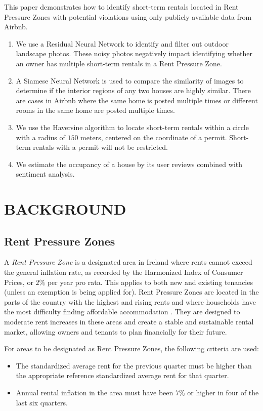 \documentclass[conference, compsoc]{IEEEtran}
\begin{document}
This paper demonstrates how to identify short-term rentals located in Rent Pressure Zones with potential violations using only publicly available data from Airbnb.
\begin{enumerate}
    \item
    We use a Residual Neural Network to identify and filter out outdoor landscape photos.
    These noisy photos negatively impact identifying whether an owner has multiple short-term rentals in a Rent Pressure Zone.

    \item
    A Siamese Neural Network is used to compare the similarity of images to determine if the interior regions of any two houses are highly similar.
    There are cases in Airbnb where the same home is posted multiple times or different rooms in the same home are posted multiple times.

    \item
    We use the Haversine algorithm to locate short-term rentals within a circle with a radius of $150$ meters, centered on the coordinate of a permit.
    Short-term rentals with a permit will not be restricted.

    \item
    We estimate the occupancy of a house by its user reviews combined with sentiment analysis.
\end{enumerate}


\section{BACKGROUND}
\subsection{Rent Pressure Zones}
\label{sct:rent-pressure-zone}
A \emph{Rent Pressure Zone} is a designated area in Ireland where rents cannot exceed the general inflation rate, as recorded by the Harmonized Index of Consumer Prices, or $2\%$ per year pro rata.
This applies to both new and existing tenancies (unless an exemption is being applied for).
Rent Pressure Zones are located in the parts of the country with the highest and rising rents and where households have the most difficulty finding affordable accommodation \cite{residential-tenancies}.
They are designed to moderate rent increases in these areas and create a stable and sustainable rental market, allowing owners and tenants to plan financially for their future.

For areas to be designated as Rent Pressure Zones, the following criteria are used:
\begin{itemize}
    \item
    The standardized average rent for the previous quarter must be higher than the appropriate reference standardized average rent for that quarter.

    \item
    Annual rental inflation in the area must have been $7\%$ or higher in four of the last six quarters.
\end{itemize}
\end{document}
